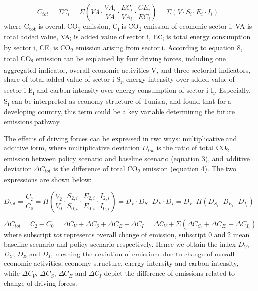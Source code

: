 \documentclass[
]{article}
\begin{document}
\[  C_{tot} = \Sigma C_{i} = \Sigma( VA \cdot \frac{VA_{i}}{VA} \cdot \frac{EC_{i}}{VA_{i}} \cdot \frac{CE_{i}}{EC_{i}} )=  \Sigma( V \cdot S_{i} \cdot E_{i} \cdot I_{i}) \tag{2}\]
where C\textsubscript{tot} is overall CO\textsubscript{2} emission,
C\textsubscript{i} is CO\textsubscript{2} emission of economic sector i,
VA is total added value, VA\textsubscript{i} is added value of sector i,
EC\textsubscript{i} is total energy consumption by sector i,
CE\textsubscript{i} is CO\textsubscript{2} emission arising from sector
i. According to equation 8, total CO\textsubscript{2} emission can be
explained by four driving forces, including one aggregated indicator,
overall economic activities V, and three sectorial indicators, share of
total added value of sector i S\textsubscript{i}, energy intensity over
added value of sector i E\textsubscript{i} and carbon intensity over
energy consumption of sector i I\textsubscript{i}. Especially,
S\textsubscript{i} can be interpreted as economy structure of Tunisia,
\textcite{grubb2015} and \textcite{kanitkar2015} found that for a
developing country, this term could be a key variable determining the
future emissions pathway.

The effects of driving forces can be expressed in two ways:
multiplicative and additive form, where multiplicative deviation
\(D_{tot}\) is the ratio of total CO\textsubscript{2} emission between
policy scenario and baseline scenario (equation 3), and additive
deviation \(\Delta C_{tot}\) is the difference of total
CO\textsubscript{2} emission (equation 4). The two expressions are shown
below:

\[ D_{tot} =\frac{C_{2}}{C_{0}} = \Pi(\frac{V_{2}}{V_{0}} \cdot \frac{S_{2,i}}{S_{0,i}} \cdot \frac{E_{2,i}}{E_{0,i}}  \cdot \frac{I_{2,i}}{I_{0,i}}) = D_{V}  \cdot  D_{S} \cdot D_{E} \cdot D_{I} = D_{V}  \cdot \Pi ( D_{S_{i}} \cdot D_{E_{i}} \cdot D_{I_{i}}) \tag{3}\]

\[ \Delta C_{tot} = C_{2} - C_{0} = \Delta C_{V} + \Delta C_{S} + \Delta C_{E} + \Delta C_{I} = \Delta C_{V} + \Sigma( \Delta C_{S_{i}} + \Delta C_{E_{i}} + \Delta C_{I_{i}}) \tag{4}\]
where subscript \(tot\) represents overall change of emission, subscript
0 and 2 mean baseline scenario and policy scenario respectively. Hence
we obtain the index \(D_{V}\), \(D_{S}\), \(D_{E}\) and \(D_{I}\),
meaning the deviation of emissions due to change of overall economic
activities, economy structure, energy intensity and carbon intensity,
while \(\Delta C_{V}\), \(\Delta C_{S}\), \(\Delta C_{E}\) and
\(\Delta C_{I}\) depict the difference of emissions related to change of
driving forces.
\end{document}

